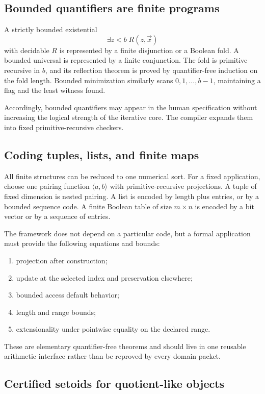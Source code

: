 \subsection{Bounded quantifiers are finite programs}

A strictly bounded existential
\[
  \exists z<b\;R(z,\vec x)
\]
with decidable \(R\) is represented by a finite disjunction or a Boolean fold.  A bounded universal is represented by a finite conjunction.  The fold is primitive recursive in \(b\), and its reflection theorem is proved by quantifier-free induction on the fold length.  Bounded minimization similarly scans \(0,1,\ldots,b-1\), maintaining a flag and the least witness found.

Accordingly, bounded quantifiers may appear in the human specification without increasing the logical strength of the iterative core.  The compiler expands them into fixed primitive-recursive checkers.

\subsection{Coding tuples, lists, and finite maps}

All finite structures can be reduced to one numerical sort.  For a fixed application, choose one pairing function \(\langle a,b\rangle\) with primitive-recursive projections.  A tuple of fixed dimension is nested pairing.  A list is encoded by length plus entries, or by a bounded sequence code.  A finite Boolean table of size \(m\times n\) is encoded by a bit vector or by a sequence of entries.

The framework does not depend on a particular code, but a formal application must provide the following equations and bounds:
\begin{enumerate}
\item projection after construction;
\item update at the selected index and preservation elsewhere;
\item bounded access default behavior;
\item length and range bounds;
\item extensionality under pointwise equality on the declared range.
\end{enumerate}
These are elementary quantifier-free theorems and should live in one reusable arithmetic interface rather than be reproved by every domain packet.

\subsection{Certified setoids for quotient-like objects}

